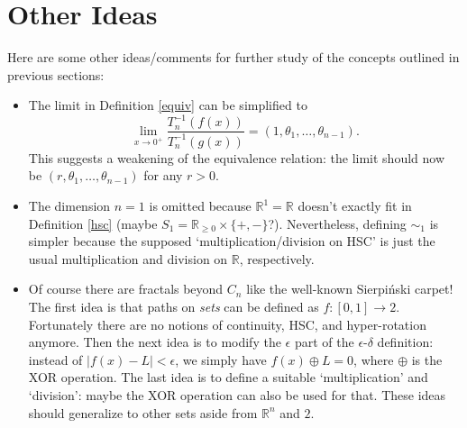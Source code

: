 \documentclass{article}
\theoremstyle{plain}
\begin{document}
\section{Other Ideas}
Here are some other ideas/comments for further study of the concepts outlined in previous sections:
\begin{itemize}
	\item The limit in Definition \ref{equiv} can be simplified to $$\lim_{x \rightarrow 0^+}\frac{T_n^{-1}(f(x))}{T_n^{-1}(g(x))} = (1, \theta_1, \ldots, \theta_{n-1}).$$ This suggests a weakening of the equivalence relation: the limit should now be $(r, \theta_1, \ldots, \theta_{n-1})$ for any $r > 0$.
	\item The dimension $n=1$ is omitted because $\mathbb{R}^1=\mathbb{R}$ doesn't exactly fit in Definition \ref{hsc} (maybe $S_1 = \mathbb{R}_{\ge 0} \times \{+, -\}$?). Nevertheless, defining $\sim_1$ is simpler because the supposed `multiplication/division on HSC' is just the usual multiplication and division on $\mathbb{R}$, respectively.
	\item Of course there are fractals beyond $C_n$ like the well-known Sierpiński carpet! The first idea is that paths on \textit{sets} can be defined as $f:[0,1] \rightarrow 2$. Fortunately there are no notions of continuity, HSC, and hyper-rotation anymore. Then the next idea is to modify the $\epsilon$ part of the $\epsilon$-$\delta$ definition: instead of $|f(x)-L|<\epsilon$, we simply have $f(x) \oplus L = 0$, where $\oplus$ is the XOR operation. The last idea is to define a suitable `multiplication' and `division': maybe the XOR operation can also be used for that. These ideas should generalize to other sets aside from $\mathbb{R}^n$ and $2$.
\end{itemize}



\end{document}
